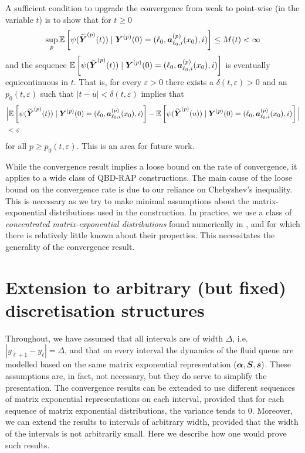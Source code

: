 A sufficient condition to upgrade the convergence from weak to point-wise (in the variable \(t\)) is to show that for \(t\geq 0\) 
\[\sup_{p}\mathbb E\left[\psi(\widetilde{\boldsymbol Y}^{(p)}(t))  \mid \boldsymbol Y^{(p)}(0)=(\ell_0,\boldsymbol  a^{(p)}_{\ell_0,i}(x_0), i )\right]  \leq M(t)<\infty\]
and the sequence \(\mathbb E\left[\psi(\widetilde{\boldsymbol Y}^{(p)}(t))  \mid \boldsymbol Y^{(p)}(0)=(\ell_0, \boldsymbol a^{(p)}_{\ell_0,i}(x_0), i) \right] \) is eventually equicontinuous in \(t\). That is, for every \(\varepsilon>0\) there exists a \(\delta(t,\varepsilon)>0\) and an \(p_0(t,\varepsilon)\) such that \(|t-u|<\delta(t,\varepsilon)\) implies that 
\begin{align}
	&\nonumber \Big|\mathbb E\left[\psi(\widetilde{\boldsymbol Y}^{(p)}(t))  \mid \boldsymbol Y^{(p)}(0)=(\ell_0, \boldsymbol a^{(p)}_{\ell_0,i}(x_0), i) \right]
	-\mathbb E\left[\psi(\widetilde{\boldsymbol Y}^{(p)}(u))  \mid \boldsymbol Y^{(p)}(0)=(\ell_0, \boldsymbol a^{(p)}_{\ell_0,i}(x_0), i) \right]\Big|
	\\&<\varepsilon
\end{align}
for all \(p\geq p_0(t,\varepsilon)\). This is an area for future work. 

\begin{rem}
	While the convergence result implies a loose bound on the rate of convergence, it applies to a wide class of QBD-RAP constructions. The main cause of the loose bound on the convergence rate is due to our reliance on Chebyshev's inequality. This is necessary as we try to make minimal assumptions about the matrix-exponential distributions used in the construction. In practice, we use a class of \emph{concentrated matrix-exponential distributions} found numerically in \citep{hht2020}, and for which there is relatively little known about their properties. This necessitates the generality of the convergence result. 
\end{rem}

\section{Extension to arbitrary (but fixed) discretisation structures}
Throughout, we have assumed that all intervals are of width \(\Delta\), i.e.~\(|y_{\ell+1}-y_\ell|=\Delta\), and that on every interval the dynamics of the fluid queue are modelled based on the same matrix exponential representation \((\boldsymbol \alpha, \boldsymbol S, \boldsymbol s)\). These assumptions are, in fact, not necessary, but they do serve to simplify the presentation. The convergence results can be extended to use different sequences of matrix exponential representations on each interval, provided that for each sequence of matrix exponential distributions, the variance tends to \(0\). Moreover, we can extend the results to intervals of arbitrary width, provided that the width of the intervals is not arbitrarily small. Here we describe how one would prove such results.

